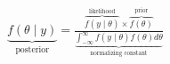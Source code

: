 \documentclass[border=3bp]{standalone}
\begin{document}
$\displaystyle \underbrace{f(\theta \mid y)}_{\text{posterior}} = \frac{\overbrace{f(y \mid \theta)}^{\text{likelihood}} \times \overbrace{f(\theta)}^{\text{prior}}}{\displaystyle \underbrace{\int_{-\infty}^\infty f(y \mid \theta)f(\theta) d\theta}_{\text{normalizing constant}}}$
\end{document}
